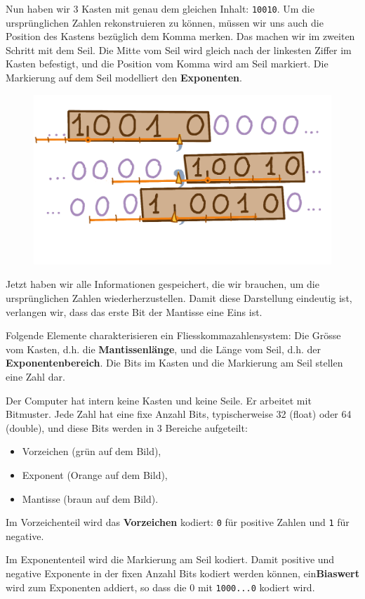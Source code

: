 Nun haben wir 3 Kasten mit genau dem gleichen Inhalt: \texttt{10010}. Um die ursprünglichen Zahlen rekonstruieren zu können, müssen wir uns auch die Position des Kastens bezüglich dem Komma merken. Das machen wir im zweiten Schritt mit dem Seil. Die Mitte vom Seil wird gleich nach der linkesten Ziffer im Kasten befestigt, und die Position vom Komma wird am Seil markiert. Die Markierung auf dem Seil modelliert den \textbf{Exponenten}.

\begin{figure}[H]
\centering
\includegraphics[width=0.65\linewidth]{Pictures/KastenMitSeil.png} 
\end{figure}

Jetzt haben wir alle Informationen gespeichert, die wir brauchen, um die ursprünglichen Zahlen wiederherzustellen. Damit diese Darstellung eindeutig ist, verlangen wir, dass das erste Bit der Mantisse eine Eins ist.

Folgende Elemente charakterisieren ein Fliesskommazahlensystem: Die Grösse vom Kasten, d.h. die \textbf{Mantissenlänge}, und die Länge vom Seil, d.h. der \textbf{Exponentenbereich}. Die Bits im Kasten und die Markierung am Seil stellen eine Zahl dar.

Der Computer hat intern keine Kasten und keine Seile. Er arbeitet mit Bitmuster. Jede Zahl hat eine fixe Anzahl Bits, typischerweise 32 (float) oder 64 (double), und diese Bits werden in \(3\) Bereiche aufgeteilt:
\begin{itemize}
\item Vorzeichen (grün auf dem Bild),
\item Exponent (Orange auf dem Bild),
\item Mantisse (braun auf dem Bild). 
\end{itemize}
Im Vorzeichenteil wird das \textbf{Vorzeichen} kodiert: \texttt{0} für positive Zahlen und \texttt{1} für negative.

Im Exponententeil wird die Markierung am Seil kodiert. Damit positive und negative Exponente in der fixen Anzahl Bits kodiert werden können, ein\textbf{Biaswert} wird zum Exponenten addiert, so dass die \(0\) mit \texttt{1000...0} kodiert wird.

